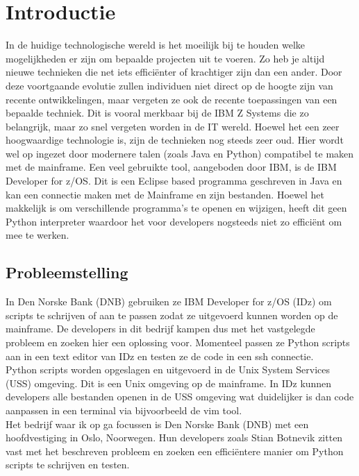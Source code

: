 \newpage
\section{Introductie}%
\label{sec:introductie}
In de huidige technologische wereld is het moeilijk bij te houden welke mogelijkheden er zijn om bepaalde projecten uit te voeren. Zo heb je altijd nieuwe technieken die net iets efficiënter of krachtiger zijn dan een ander. Door deze voortgaande evolutie zullen individuen niet direct op de hoogte zijn van recente ontwikkelingen, maar vergeten ze ook de recente toepassingen van een bepaalde techniek. Dit is vooral merkbaar bij de IBM Z Systems die zo belangrijk, maar zo snel vergeten worden in de IT wereld. Hoewel het een zeer hoogwaardige technologie is, zijn de technieken nog steeds zeer oud. Hier wordt wel op ingezet door modernere talen (zoals Java en Python) compatibel te maken met de mainframe. Een veel gebruikte tool, aangeboden door IBM, is de IBM Developer for z/OS. Dit is een Eclipse based programma geschreven in Java en kan een connectie maken met de Mainframe en zijn bestanden. Hoewel het makkelijk is om verschillende programma's te openen en wijzigen, heeft dit geen Python interpreter waardoor het voor developers nogsteeds niet zo efficiënt om mee te werken.


\subsection{Probleemstelling}
In Den Norske Bank (DNB) gebruiken ze IBM Developer for z/OS (IDz) om scripts te schrijven of aan te passen zodat ze uitgevoerd kunnen worden op de mainframe. De developers in dit bedrijf kampen dus met het vastgelegde probleem en zoeken hier een oplossing voor. Momenteel passen ze Python scripts aan in een text editor van IDz en testen ze de code in een ssh connectie. \\
Python scripts worden opgeslagen en uitgevoerd in de Unix System Services (USS) omgeving. Dit is een Unix omgeving op de mainframe. In IDz kunnen developers alle bestanden openen in de USS omgeving wat duidelijker is dan code aanpassen in een terminal via bijvoorbeeld de vim tool.  
\\
Het bedrijf waar ik op ga focussen is Den Norske Bank (DNB) met een hoofdvestiging in Oslo, Noorwegen. Hun developers zoals Stian Botnevik zitten vast met het beschreven probleem en zoeken een efficiëntere manier om Python scripts te schrijven en testen. 



